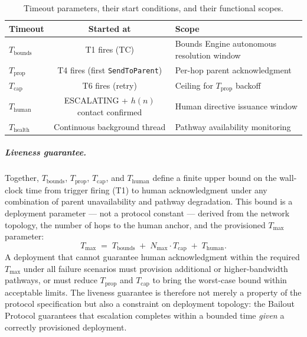 \begin{table}[htbp]
\caption{Timeout parameters, their start conditions, and their functional scopes.}
\label{tab:timeouts}
\begin{tabular}{@{}lcl@{}}
\toprule
\textbf{Timeout} & \textbf{Started at} & \textbf{Scope} \\
\midrule
$T_{\text{bounds}}$   & T1 fires (TC)                           & Bounds Engine autonomous resolution window      \\
$T_{\text{prop}}$     & T4 fires (first \texttt{SendToParent})   & Per-hop parent acknowledgment                    \\
$T_{\text{cap}}$      & T6 fires (retry)                        & Ceiling for $T_{\text{prop}}$ backoff           \\
$T_{\text{human}}$    & ESCALATING + $h(n)$ contact confirmed   & Human directive issuance window                 \\
$T_{\text{health}}$   & Continuous background thread            & Pathway availability monitoring                  \\
\bottomrule
\end{tabular}
\end{table}

\subparagraph{Liveness guarantee.} Together, $T_{\text{bounds}}$, $T_{\text{prop}}$, $T_{\text{cap}}$, and $T_{\text{human}}$ define a finite upper bound on the wall-clock time from trigger firing (T1) to human acknowledgment under any combination of parent unavailability and pathway degradation. This bound is a deployment parameter — not a protocol constant — derived from the network topology, the number of hops to the human anchor, and the provisioned $T_{\max}$ parameter:
\begin{equation}
T_{\max} \;=\; T_{\text{bounds}} \;+\; N_{\max} \cdot T_{\text{cap}} \;+\; T_{\text{human}}. \tag{T-BOUND}
\end{equation}
A deployment that cannot guarantee human acknowledgment within the required $T_{\max}$ under all failure scenarios must provision additional or higher-bandwidth pathways, or must reduce $T_{\text{prop}}$ and $T_{\text{cap}}$ to bring the worst-case bound within acceptable limits. The liveness guarantee is therefore not merely a property of the protocol specification but also a constraint on deployment topology: the Bailout Protocol guarantees that escalation completes within a bounded time \emph{given} a correctly provisioned deployment.

